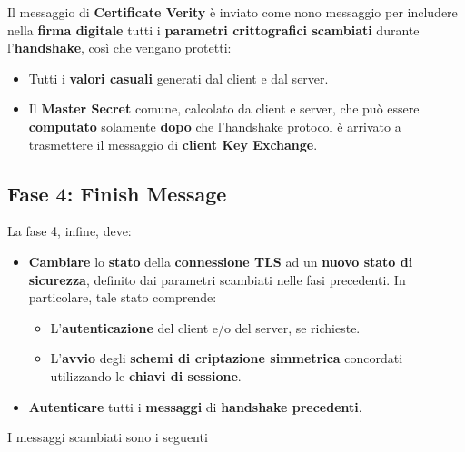 \begin{note}
Il messaggio di \textbf{Certificate Verity} è inviato come nono messaggio per includere nella \textbf{firma digitale} tutti i \textbf{parametri crittografici scambiati} durante l'\textbf{handshake}, così che vengano protetti:
\begin{itemize}
    \item Tutti i \textbf{valori casuali} generati dal client e dal server.
    \item Il \textbf{Master Secret} comune, calcolato da client e server, che può essere \textbf{computato} solamente \textbf{dopo} che l'handshake protocol è arrivato a trasmettere il messaggio di \textbf{client Key Exchange}.
\end{itemize}
\end{note}
\subsection{Fase 4: Finish Message}
La fase 4, infine, deve:
\begin{proposition}[Phase 4]\label{prop:phase4}
\begin{itemize}
    \item \textbf{Cambiare} lo \textbf{stato} della \textbf{connessione TLS} ad un \textbf{nuovo stato di sicurezza}, definito dai parametri scambiati nelle fasi precedenti. In particolare, tale stato comprende:
    \begin{itemize}
        \item L'\textbf{autenticazione} del client e/o del server, se richieste.
        \item L'\textbf{avvio} degli \textbf{schemi di criptazione simmetrica} concordati utilizzando le \textbf{chiavi di sessione}.
    \end{itemize}
    \item \textbf{Autenticare} tutti i \textbf{messaggi} di \textbf{handshake precedenti}.
\end{itemize}
\end{proposition}
I messaggi scambiati sono i seguenti
